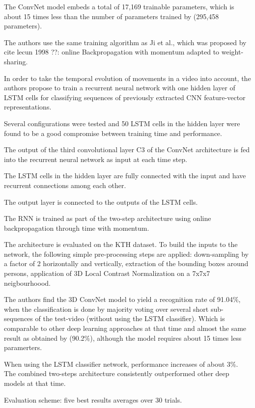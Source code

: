 The ConvNet model embeds a total of 17,169 trainable parameters, which is about 15 times less than the number of parameters trained by \textcite{ji_3d_2013} (295,458 parameters).

The authors use the same training algorithm as Ji et al., which was proposed by cite lecun 1998 ??: online Backpropagation with momentum adapted to weight-sharing.

In order to take the temporal evolution of movements in a video into account, the authors propose to train a recurrent neural network with one hidden layer of LSTM cells for classifying sequences of previously extracted CNN feature-vector representations.

Several configurations were tested and 50 LSTM cells in the hidden layer were found to be a good compromise between training time and performance.

The output of the third convolutional layer C3 of the ConvNet architecture is fed into the recurrent neural network as input at each time step.

The LSTM cells in the hidden layer are fully connected with the input and have recurrent connections among each other. 

The output layer is connected to the outputs of the LSTM cells.

The RNN is trained as part of the two-step architecture using online backpropagation through time with momentum.

The architecture is evaluated on the KTH dataset. To build the inputs to the network, the following simple pre-processing steps are applied: down-sampling by a factor of 2 horizontally and vertically, extraction of the bounding boxes around persons, application of 3D Local Contrast Normalization on a 7x7x7 neigbourhoood.

The authors find the 3D ConvNet model to yield a recognition rate of 91.04\%, when the classification is done by majority voting over several short sub-sequences of the test-video (without using the LSTM classifier).
Which is comparable to other deep learning approaches at that time and almost the same result as obtained by \textcite{ji_3d_2013} (90.2\%), although the model requires about 15 times less paramerters.

When using the LSTM classifier network, performance increases of about 3\%. The combined two-steps architecture consistently outperformed other deep models at that time.

Evaluation scheme: five best results averages over 30 trials.

